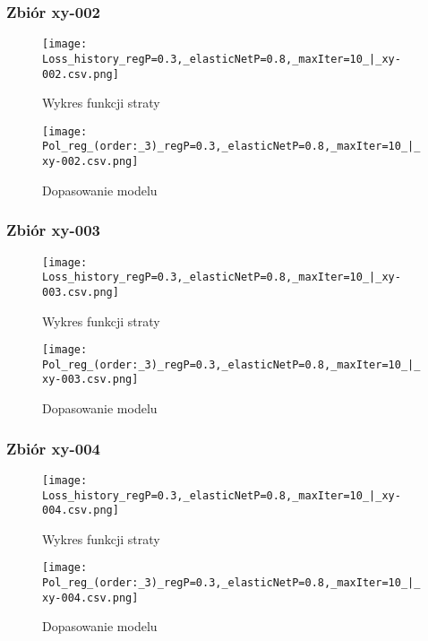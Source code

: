 \documentclass{article}
\begin{document}
\subsubsection{Zbiór xy-002}
\begin{figure}[H]
    \centering
    \begin{minipage}{0.45\textwidth}
        \texttt{[image: Loss\_history\_regP=0.3,\_elasticNetP=0.8,\_maxIter=10\_|\_xy-002.csv.png]}
        \caption{Wykres funkcji straty}
    \end{minipage}
    \hfill
    \begin{minipage}{0.45\textwidth}
        \texttt{[image: Pol\_reg\_(order:\_3)\_regP=0.3,\_elasticNetP=0.8,\_maxIter=10\_|\_xy-002.csv.png]}
        \caption{Dopasowanie modelu}
    \end{minipage}
\end{figure}

\subsubsection{Zbiór xy-003}
\begin{figure}[H]
    \centering
    \begin{minipage}{0.45\textwidth}
        \texttt{[image: Loss\_history\_regP=0.3,\_elasticNetP=0.8,\_maxIter=10\_|\_xy-003.csv.png]}
        \caption{Wykres funkcji straty}
    \end{minipage}
    \hfill
    \begin{minipage}{0.45\textwidth}
        \texttt{[image: Pol\_reg\_(order:\_3)\_regP=0.3,\_elasticNetP=0.8,\_maxIter=10\_|\_xy-003.csv.png]}
        \caption{Dopasowanie modelu}
    \end{minipage}
\end{figure}

\subsubsection{Zbiór xy-004}
\begin{figure}[H]
    \centering
    \begin{minipage}{0.45\textwidth}
        \texttt{[image: Loss\_history\_regP=0.3,\_elasticNetP=0.8,\_maxIter=10\_|\_xy-004.csv.png]}
        \caption{Wykres funkcji straty}
    \end{minipage}
    \hfill
    \begin{minipage}{0.45\textwidth}
        \texttt{[image: Pol\_reg\_(order:\_3)\_regP=0.3,\_elasticNetP=0.8,\_maxIter=10\_|\_xy-004.csv.png]}
        \caption{Dopasowanie modelu}
    \end{minipage}
\end{figure}
\end{document}

